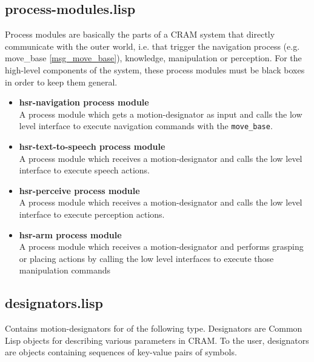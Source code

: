 \documentclass[main.tex]{subfiles}
\begin{document}
        \subsection{process-modules.lisp}
        Process modules are basically the parts of a CRAM system that directly communicate with the outer world, i.e. that trigger the navigation process (e.g. move\_base \ref{msg_move_base}), knowledge, manipulation or perception. For the high-level components of the system, these process modules must be black boxes in order to keep them general.
         \begin{itemize}
        \label{pcm}
            \item \textbf{hsr-navigation process module} \\
        A process module which gets a motion-designator as input and calls the low level interface to execute navigation commands with the \texttt{move\_base}.
        \item \textbf{hsr-text-to-speech process module} \\
        A process module which receives a motion-designator and calls the low level interface to execute speech actions.
        \item \textbf{hsr-perceive process module} \\
        A process module which receives a motion-designator and calls the low level interface to execute perception actions.
        \item\textbf{hsr-arm process module} \\
        A process module which receives a motion-designator and performs grasping or placing actions by calling the low level interfaces to execute those manipulation commands 
        \end{itemize}
        \subsection{designators.lisp}
        Contains motion-designators for of the following type. Designators are Common Lisp objects for describing various parameters in CRAM. To the user, designators are objects containing sequences of key-value pairs of symbols.
      
\end{document}
